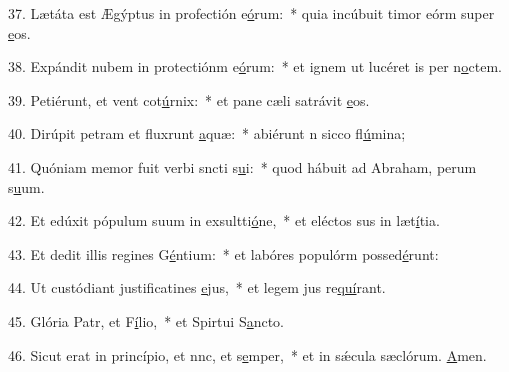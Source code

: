 37. Lætáta est Ægýptus in profectión e\uline{ó}rum:~* quia incúbuit timor eórm super \uline{e}os.\par 
38. Expándit nubem in protectiónm e\uline{ó}rum:~* et ignem ut lucéret is per n\uline{o}ctem.\par 
39. Petiérunt, et vent cot\uline{ú}rnix:~* et pane cæli satrávit \uline{e}os.\par 
40. Dirúpit petram et fluxrunt \uline{a}quæ:~* abiérunt n sicco fl\uline{ú}mina;\par 
41. Quóniam memor fuit verbi sncti s\uline{u}i:~* quod hábuit ad Abraham, perum s\uline{u}um.\par 
42. Et edúxit pópulum suum in exsultti\uline{ó}ne,~* et eléctos sus in læt\uline{í}tia.\par 
43. Et dedit illis regines G\uline{é}ntium:~* et labóres populórm possed\uline{é}runt:\par 
44. Ut custódiant justificatines \uline{e}jus,~* et legem jus re\uline{quí}rant.\par 
45. Glória Patr, et F\uline{í}lio,~* et Spirtui S\uline{a}ncto.\par 
46. Sicut erat in princípio, et nnc, et s\uline{e}mper,~* et in sǽcula sæclórum. \uline{A}men.\par 
